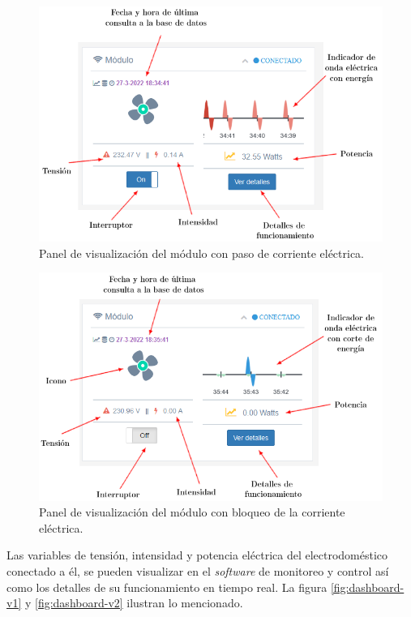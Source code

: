 \begin{figure}[htpb]
\centering 
\includegraphics[width=1.0\textwidth]{./Figures/test/consumo/panel5.png}
\caption{Panel de visualización del módulo con paso de corriente eléctrica.}
\label{fig:test-panel5}
\end{figure}


\begin{figure}[htpb]
\centering 
\includegraphics[width=1.0\textwidth]{./Figures/test/consumo/panel4.png}
\caption{Panel de visualización del módulo con bloqueo de la corriente eléctrica.}
\label{fig:test-panel4}
\end{figure}

Las variables de tensión, intensidad y potencia eléctrica del electrodoméstico conectado a él, se pueden visualizar en el \emph{software} de monitoreo y control así como los detalles de su funcionamiento en tiempo real. La figura \ref{fig:dashboard-v1} y \ref{fig:dashboard-v2} ilustran lo mencionado.

